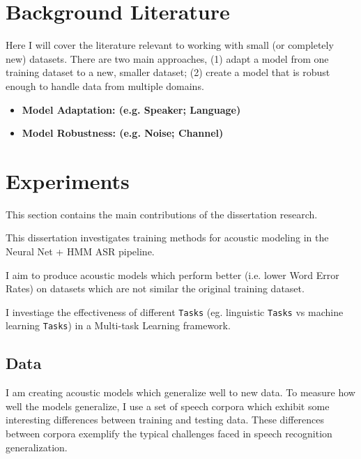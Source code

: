\documentclass[10pt,a4paper]{article}
\begin{document}
\newpage

\section{Background Literature}

Here I will cover the literature relevant to working with small (or completely new) datasets. There are two main approaches, (1) adapt a model from one training dataset to a new, smaller dataset; (2) create a model that is robust enough to handle data from multiple domains. 

\begin{itemize}

\item \textbf{Model Adaptation: (e.g. Speaker; Language)}

    
  
\item \textbf{Model Robustness: (e.g. Noise; Channel)}

  
\end{itemize}



\newpage

\section{Experiments}

This section contains the main contributions of the dissertation research.

This dissertation investigates training methods for acoustic modeling in the Neural Net + HMM ASR pipeline.

I aim to produce acoustic models which perform better (i.e. lower Word Error Rates) on datasets which are not similar the original training dataset.

I investiage the effectiveness of different \texttt{Tasks} (eg. linguistic \texttt{Tasks} vs machine learning \texttt{Tasks}) in a Multi-task Learning framework.


\subsection{Data}

I am creating acoustic models which generalize well to new data. To measure how well the models generalize, I use a set of speech corpora which exhibit some interesting differences between training and testing data. These differences between corpora exemplify the typical challenges faced in speech recognition generalization.
\end{document}
